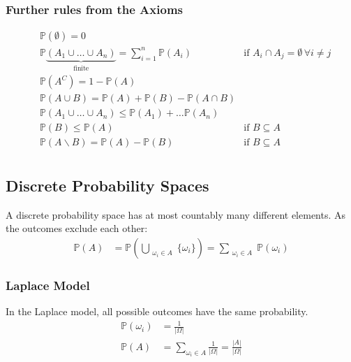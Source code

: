 \subsubsection{Further rules from the Axioms}\label{sssec:rules_from_axioms}
\noindent\begin{align*}
     & \mathbb{P}(\emptyset) = 0                                                                                                                                  \\
     & \mathbb{P}  \underbrace{(A_1 \cup \dots \cup A_n)}_{\text{finite}} = \sum_{i=1}^{n} \mathbb{P}(A_i) & \text{if } A_i\cap A_j = \emptyset\, \forall i\neq j \\
     & \mathbb{P}(A^C) = 1-\mathbb{P}(A)                                                                                                                          \\
     & \mathbb{P}(A\cup B) = \mathbb{P}(A)+\mathbb{P}(B) - \mathbb{P}(A\cap B)                                                                                    \\
     & \mathbb{P}(A_1 \cup \dots \cup A_n) \leq \mathbb{P}(A_1)+\dots \mathbb{P}(A_n)                                                                             \\
     & \mathbb{P}(B) \leq \mathbb{P}(A)                                                                    & \text{if } B\subseteq A                              \\
     & \mathbb{P}(A\backslash B) = \mathbb{P}(A)-\mathbb{P}(B)                                             & \text{if } B\subseteq A                              \\
\end{align*}

\subsection{Discrete Probability Spaces}
A discrete probability space has at most countably many different elements. As the outcomes exclude each other:
\noindent\begin{align*}
    \mathbb{P}(A) & = \mathbb{P}\left(\bigcup_{\substack{\omega_i \in A}}\{\omega_i\}\right)= \sum_{\substack{\omega_i \in A}} \mathbb{P}(\omega_i)
\end{align*}
\subsubsection{Laplace Model}
In the Laplace model, all possible outcomes have the same probability.
\noindent\begin{align*}
    \mathbb{P}(\omega_i) & = \frac{1}{|\Omega|}                                             \\
    \mathbb{P}(A)        & = \sum_{\omega_i \in A}\frac{1}{|\Omega|} = \frac{|A|}{|\Omega|}
\end{align*}

